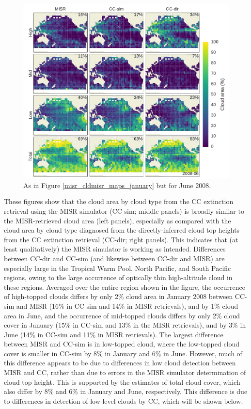 \begin{figure}
\centering
\includegraphics[width=\columnwidth]{graphics/misr_cldmisr_maps_2008-06.pdf}
\caption{As in Figure \ref{misr_cldmisr_maps_january} but for June 2008.}
\label{misr_cldmisr_maps_june}
\end{figure}

These figures show that the cloud area by cloud type from the CC extinction retrieval using the MISR-simulator (CC-sim; middle panels) is broadly similar to the MISR-retrieved cloud area (left panels), especially as compared with the cloud area by cloud type diagnosed from the directly-inferred cloud top heights from the CC extinction retrieval (CC-dir; right panels). This indicates that (at least qualitatively) the MISR simulator is working as intended. Differences between CC-dir and CC-sim (and likewise between CC-dir and MISR) are especially large in the Tropical Warm Pool, North Pacific, and South Pacific regions, owing to the large occurrence of optically thin high-altitude cloud in these regions. Averaged over the entire region shown in the figure, the occurrence of high-topped clouds differs by only 2\% cloud area in January 2008 between CC-sim and MISR (16\% in CC-sim and 14\% in MISR retrievals), and by 1\% cloud area in June, and the occurrence of mid-topped clouds differs by only 2\% cloud cover in January (15\% in CC-sim and 13\% in the MISR retrievals), and by 3\% in June (14\% in CC-sim and 11\% in MISR retrievals). The largest difference between MISR and CC-sim is in low-topped cloud, where the low-topped cloud cover is smaller in CC-sim by 8\% in January and 6\% in June. However, much of this difference appears to be due to differences in low cloud detection between MISR and CC, rather than due to errors in the MISR simulator determination of cloud top height. This is supported by the estimates of total cloud cover, which also differ by 8\% and 6\% in January and June, respectively. This difference is due to differences in detection of low-level clouds by CC, which will be shown below.

